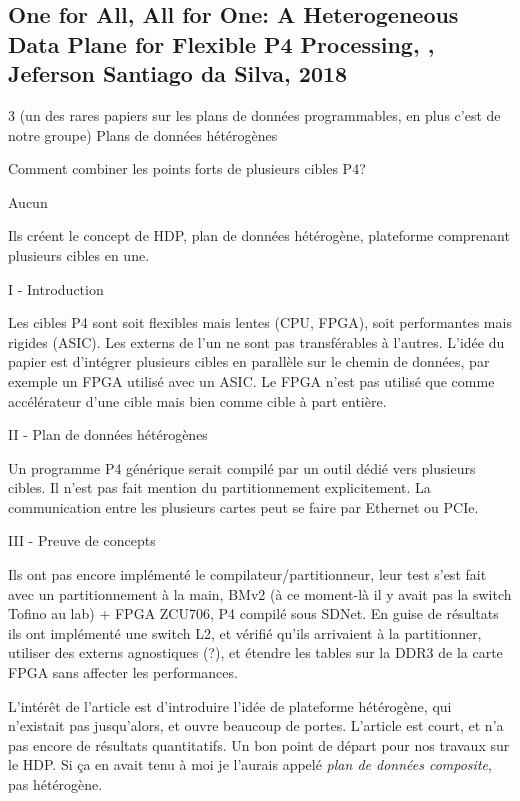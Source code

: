 
\subsection{One for All, All for One: A Heterogeneous Data Plane for Flexible P4 Processing, \cite{santiago_da_silva_one_2018}, Jeferson Santiago da Silva, 2018}
 3 (un des rares papiers sur les plans de données programmables, en plus c'est de notre groupe)
 Plans de données hétérogènes

 Comment combiner les points forts de plusieurs cibles P4?

 Aucun

 Ils créent le concept de HDP, plan de données hétérogène, plateforme comprenant plusieurs cibles en une.


I - Introduction

Les cibles P4 sont soit flexibles mais lentes (CPU, FPGA), soit performantes mais rigides (ASIC). Les externs de l'un ne sont pas transférables à l'autres. L'idée du papier est d'intégrer plusieurs cibles en parallèle sur le chemin de données, par exemple un FPGA utilisé avec un ASIC. Le FPGA n'est pas utilisé que comme accélérateur d'une cible mais bien comme cible à part entière.

II - Plan de données hétérogènes

Un programme P4 générique serait compilé par un outil dédié vers plusieurs cibles. Il n'est pas fait mention du partitionnement explicitement. La communication entre les plusieurs cartes peut se faire par Ethernet ou PCIe.

III - Preuve de concepts

 Ils ont pas encore implémenté le compilateur/partitionneur, leur test s'est fait avec un partitionnement à la main, BMv2 (à ce moment-là il y avait pas la switch Tofino au lab) + FPGA ZCU706, P4 compilé sous SDNet. En guise de résultats ils ont implémenté une switch L2, et vérifié qu'ils arrivaient à la partitionner, utiliser des externs agnostiques (?), et étendre les tables sur la DDR3 de la carte FPGA sans affecter les performances.

 L'intérêt de l'article est d'introduire l'idée de plateforme hétérogène, qui n'existait pas jusqu'alors, et ouvre beaucoup de portes. L'article est court, et n'a pas encore de résultats quantitatifs. Un bon point de départ pour nos travaux sur le HDP. Si ça en avait tenu à moi je l'aurais appelé \emph{plan de données composite}, pas hétérogène.

\clearpage
